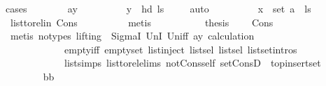\begin{isabellebody}
{\isacharparenleft}{\kern0pt}cases{\isacharparenright}{\kern0pt}\isanewline
\ \ \ \ \ \ \isamarkupfalse%
\ ay\isanewline
\ \ \ \ \ \ \isamarkupfalse%
\ \isamarkupfalse%
\ {\isachardoublequoteopen}y\ {\isacharequal}{\kern0pt}\ hd\ ls{\isachardoublequoteclose}\ \isamarkupfalse%
\ {}\ \isamarkupfalse%
\ auto\isanewline
\ \ \ \ \ \ \isamarkupfalse%
\ \isamarkupfalse%
\ {\isachardoublequoteopen}x\ {\isasymin}\ set\ {\isacharparenleft}{\kern0pt}a\ {\isacharhash}{\kern0pt}\ ls{}{\isacharparenright}{\kern0pt}{\isachardoublequoteclose}\ \isamarkupfalse%
\ list{\isacharunderscore}{\kern0pt}to{\isacharunderscore}{\kern0pt}rel{\isacharunderscore}{\kern0pt}in\ Cons\isanewline
\ \ \ \ \ \ \ \ \isamarkupfalse%
\ metis\ \isanewline
\ \ \ \ \ \ \isamarkupfalse%
\ \isamarkupfalse%
\ {\isacharquery}{\kern0pt}thesis\ \ \isamarkupfalse%
\ \ Cons\isanewline
\ \ \ \ \ \ \ \ \isamarkupfalse%
\ {\isacharparenleft}{\kern0pt}metis\ {\isacharparenleft}{\kern0pt}no{\isacharunderscore}{\kern0pt}types{\isacharcomma}{\kern0pt}\ lifting{\isacharparenright}{\kern0pt}\ {\isachardoublequoteopen}{}{\isachardoublequoteclose}\ SigmaI\ UnI{}\ Un{\isacharunderscore}{\kern0pt}iff\ ay\ calculation\ \isanewline
\ \ \ \ \ \ \ \ \ \ \ \ empty{\isacharunderscore}{\kern0pt}iff\ empty{\isacharunderscore}{\kern0pt}set\ list{\isachardot}{\kern0pt}inject\ list{\isachardot}{\kern0pt}sel{\isacharparenleft}{\kern0pt}{}{\isacharparenright}{\kern0pt}\ list{\isachardot}{\kern0pt}sel{\isacharparenleft}{\kern0pt}{}{\isacharparenright}{\kern0pt}\ list{\isachardot}{\kern0pt}set{\isacharunderscore}{\kern0pt}intros{\isacharparenleft}{\kern0pt}{}{\isacharparenright}{\kern0pt}\ \isanewline
\ \ \ \ \ \ \ \ \ \ \ \ list{\isachardot}{\kern0pt}simps{\isacharparenleft}{\kern0pt}{}{}{\isacharparenright}{\kern0pt}\ list{\isacharunderscore}{\kern0pt}to{\isacharunderscore}{\kern0pt}rel{\isachardot}{\kern0pt}elims\ not{\isacharunderscore}{\kern0pt}Cons{\isacharunderscore}{\kern0pt}self{}\ set{\isacharunderscore}{\kern0pt}ConsD\ \ top{\isacharunderscore}{\kern0pt}insert{\isacharunderscore}{\kern0pt}set{\isacharparenright}{\kern0pt}\ \isanewline
\ \ \ \ \isamarkupfalse%
\isanewline
\ \ \ \ \ \ \isamarkupfalse%
\ bb\isanewline
\ \ \ \ \ \ \isamarkupfalse%

\end{isabellebody}
